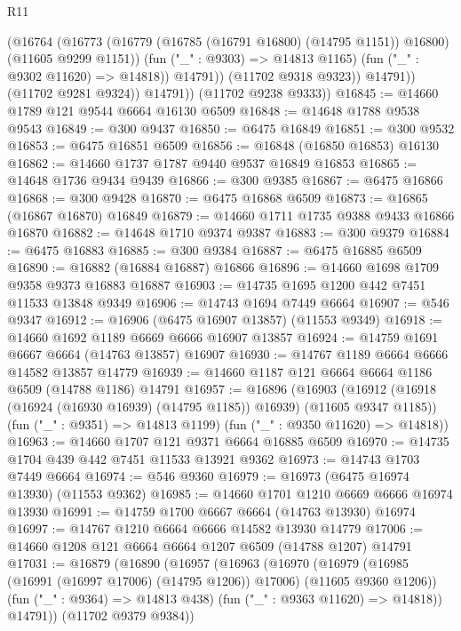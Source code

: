 \begin{lexlean}{R11}
\begin{coremodule}
{{{{{{{{{{{{{{{{{{{{{{{{{{{{{{{{{{{{{{{{{{{{{{{{{{{{{{{{{{{{{{{{{{{{{{{{{{{{{{{{{{                      (@16764
                        (@16773
                          (@16779 (@16785 (@16791 @16800) (@14795 @1151)) @16800)
                          (@11605 @9299 @1151))
                        (fun ("_" : @9303) => @14813 @1165)
                        (fun ("_" : @9302 @11620) => @14818))
                      @14791))
                  (@11702 @9318 @9323))
                @14791))
            (@11702 @9281 @9324))
          @14791))
      (@11702 @9238 @9333))
@16845 := @14660 @1789 @121 @9544 @6664 @16130 @6509
@16848 := @14648 @1788 @9538 @9543
@16849 := @300 @9437
@16850 := @6475 @16849
@16851 := @300 @9532
@16853 := @6475 @16851 @6509
@16856 := @16848 (@16850 @16853) @16130
@16862 := @14660 @1737 @1787 @9440 @9537 @16849 @16853
@16865 := @14648 @1736 @9434 @9439
@16866 := @300 @9385
@16867 := @6475 @16866
@16868 := @300 @9428
@16870 := @6475 @16868 @6509
@16873 := @16865 (@16867 @16870) @16849
@16879 := @14660 @1711 @1735 @9388 @9433 @16866 @16870
@16882 := @14648 @1710 @9374 @9387
@16883 := @300 @9379
@16884 := @6475 @16883
@16885 := @300 @9384
@16887 := @6475 @16885 @6509
@16890 := @16882 (@16884 @16887) @16866
@16896 := @14660 @1698 @1709 @9358 @9373 @16883 @16887
@16903 := @14735 @1695 @1200 @442 @7451 @11533 @13848 @9349
@16906 := @14743 @1694 @7449 @6664
@16907 := @546 @9347
@16912 := @16906 (@6475 @16907 @13857) (@11553 @9349)
@16918 := @14660 @1692 @1189 @6669 @6666 @16907 @13857
@16924 := @14759 @1691 @6667 @6664 (@14763 @13857) @16907
@16930 := @14767 @1189 @6664 @6666 @14582 @13857 @14779
@16939 := @14660 @1187 @121 @6664 @6664 @1186 @6509 (@14788 @1186) @14791
@16957 := @16896
    (@16903
      (@16912 (@16918 (@16924 (@16930 @16939) (@14795 @1185)) @16939) (@11605 @9347 @1185))
      (fun ("_" : @9351) => @14813 @1199)
      (fun ("_" : @9350 @11620) => @14818))
@16963 := @14660 @1707 @121 @9371 @6664 @16885 @6509
@16970 := @14735 @1704 @439 @442 @7451 @11533 @13921 @9362
@16973 := @14743 @1703 @7449 @6664
@16974 := @546 @9360
@16979 := @16973 (@6475 @16974 @13930) (@11553 @9362)
@16985 := @14660 @1701 @1210 @6669 @6666 @16974 @13930
@16991 := @14759 @1700 @6667 @6664 (@14763 @13930) @16974
@16997 := @14767 @1210 @6664 @6666 @14582 @13930 @14779
@17006 := @14660 @1208 @121 @6664 @6664 @1207 @6509 (@14788 @1207) @14791
@17031 := @16879
    (@16890
      (@16957
        (@16963
          (@16970
            (@16979 (@16985 (@16991 (@16997 @17006) (@14795 @1206)) @17006) (@11605 @9360 @1206))
            (fun ("_" : @9364) => @14813 @438)
            (fun ("_" : @9363 @11620) => @14818))
          @14791))
      (@11702 @9379 @9384))
}}}}}}}}}}}}}}}}}}}}}}}}}}}}}}}}}}}}}}}}}}}}}}}}}}}}}}}}}}}}}}}}}}}}}}}}}}}}}}}}}}
\end{coremodule}
\end{lexlean}
